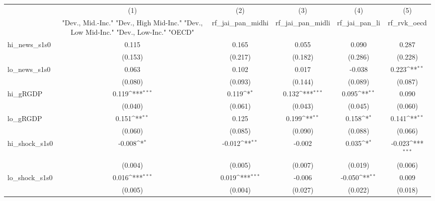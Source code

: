 {
\def\sym#1{\ifmmode^{#1}\else\(^{#1}\)\fi}
\begin{tabular}{l*{5}{c}}
\toprule
            &\multicolumn{1}{c}{(1)}&\multicolumn{1}{c}{(2)}&\multicolumn{1}{c}{(3)}&\multicolumn{1}{c}{(4)}&\multicolumn{1}{c}{(5)}\\
            &\multicolumn{1}{c}{ "Dev., Mid.-Inc." "Dev., High Mid-Inc." "Dev., Low Mid-Inc." "Dev., Low-Inc." "OECD" }&\multicolumn{1}{c}{rf\_jai\_pan\_midhi}&\multicolumn{1}{c}{rf\_jai\_pan\_midli}&\multicolumn{1}{c}{rf\_jai\_pan\_li}&\multicolumn{1}{c}{rf\_rvk\_oecd}\\
\midrule
hi\_news\_s1s0&       0.115         &       0.165         &       0.055         &       0.090         &       0.287         \\
            &     (0.153)         &     (0.217)         &     (0.182)         &     (0.286)         &     (0.228)         \\
\addlinespace
lo\_news\_s1s0&       0.063         &       0.102         &       0.017         &      -0.038         &       0.223\sym{**} \\
            &     (0.080)         &     (0.093)         &     (0.144)         &     (0.089)         &     (0.087)         \\
\addlinespace
hi\_gRGDP    &       0.119\sym{***}&       0.119\sym{*}  &       0.132\sym{***}&       0.095\sym{**} &       0.090         \\
            &     (0.040)         &     (0.061)         &     (0.043)         &     (0.045)         &     (0.060)         \\
\addlinespace
lo\_gRGDP    &       0.151\sym{**} &       0.125         &       0.199\sym{**} &       0.158\sym{*}  &       0.141\sym{**} \\
            &     (0.060)         &     (0.085)         &     (0.090)         &     (0.088)         &     (0.066)         \\
\addlinespace
hi\_shock\_s1s0&      -0.008\sym{*}  &      -0.012\sym{**} &      -0.002         &       0.035\sym{*}  &      -0.023\sym{***}\\
            &     (0.004)         &     (0.005)         &     (0.007)         &     (0.019)         &     (0.006)         \\
\addlinespace
lo\_shock\_s1s0&       0.016\sym{***}&       0.019\sym{***}&      -0.006         &      -0.050\sym{**} &       0.009         \\
            &     (0.005)         &     (0.004)         &     (0.027)         &     (0.022)         &     (0.018)         \\

\end{tabular}}

